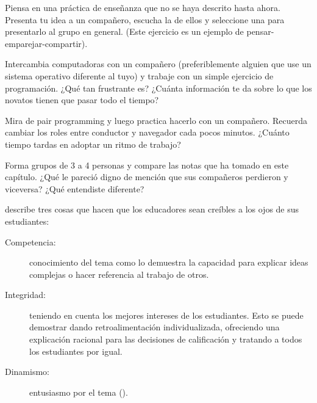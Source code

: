 
Piensa en una práctica de enseñanza que no se haya descrito hasta ahora.
Presenta tu idea a un compañero,
escucha la de ellos
y seleccione una para presentarlo al grupo en general.
(Este ejercicio es un ejemplo de pensar-emparejar-compartir).


Intercambia computadoras con un compañero
(preferiblemente alguien que use un sistema operativo diferente al tuyo)
y trabaje con un simple ejercicio de programación.
¿Qué tan frustrante es?
¿Cuánta información te da sobre lo que los novatos tienen que pasar todo el tiempo?


Mira  de pair programming
y luego practica hacerlo con un compañero.
Recuerda cambiar los roles entre conductor y navegador cada pocos minutos.
¿Cuánto tiempo tardas en adoptar un ritmo de trabajo?


Forma grupos de 3 a 4 personas
y compare las notas que ha tomado en este capítulo.
¿Qué le pareció digno de mención que sus compañeros perdieron y viceversa?
¿Qué entendiste diferente?


\cite{Fink2013} describe tres cosas
que hacen que los educadores sean creíbles a los ojos de sus estudiantes:

\begin{description}

\item[Competencia:]
  conocimiento del tema
  como lo demuestra la capacidad para explicar ideas complejas
  o hacer referencia al trabajo de otros.
 
\item[Integridad:]
  teniendo en cuenta los mejores intereses de los estudiantes.
  Esto se puede demostrar dando retroalimentación individualizada,
  ofreciendo una explicación racional para las decisiones de calificación
  y tratando a todos los estudiantes por igual.

\item[Dinamismo:]
  entusiasmo por el tema ().

\end{description}

